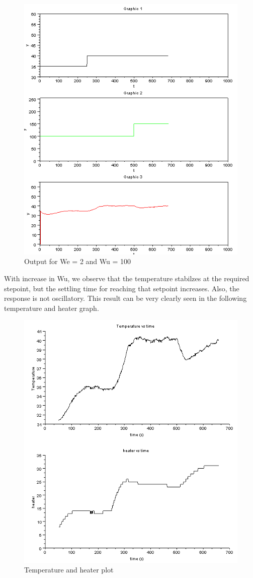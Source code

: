 \begin{figure}[H]
\centering
  \includegraphics[width=0.8\linewidth]{mpc/5_2.PNG}
  \caption{Output for We = 2 and Wu = 100}
\end{figure}
With increase in Wu, we observe that the temperature stabilzes at the required stepoint, but the settling time for reaching that setpoint increases. Also, the response is not oscillatory. This result can be very clearly seen in the following temperature and heater graph.
\begin{figure}[H]
\centering
  \includegraphics[]{mpc/5_2_heater_final.png}
  \caption{Temperature and heater plot}
\end{figure}

